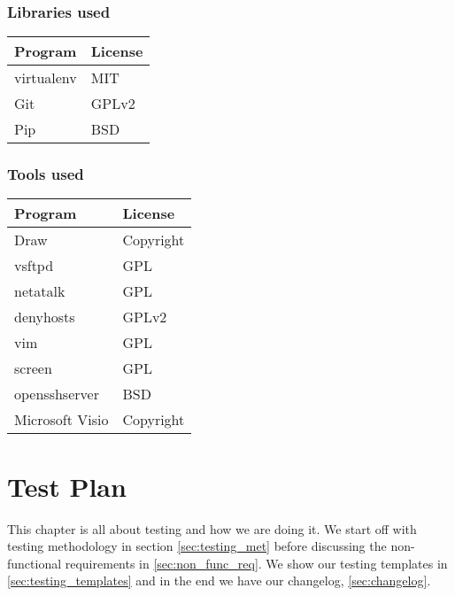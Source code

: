 \documentclass{report}
\begin{document}
\subsection{Libraries used} \label{sec:licenses_libraries}
\begin{tabular}{|l|l|}  \hline
\textbf{Program} & \textbf{License} \\ \hline
virtualenv & \cellcolor{green!25}MIT\cite{license_virtualenv} \\ \hline
Git & \cellcolor{green!25}GPLv2\cite{license_git} \\ \hline
Pip &\cellcolor{green!25} BSD\cite{license_pip} \\ \hline
\end{tabular}
\subsection{Tools used} \label{sec:licenses_tools}
\begin{tabular}{|l|l|}  \hline
\textbf{Program} & \textbf{License} \\ \hline
Draw & \cellcolor{yellow!25}Copyright\cite{license_drawio}  \\ \hline
vsftpd &\cellcolor{green!25} GPL\cite{license_vsftpd}  \\ \hline
netatalk & \cellcolor{green!25}GPL\cite{license_netatalk}  \\ \hline
denyhosts & \cellcolor{green!25}GPLv2\cite{license_denyhosts}  \\ \hline
vim & \cellcolor{green!25}GPL\cite{license_vim}  \\ \hline
screen &\cellcolor{green!25} GPL\cite{license_screen}  \\ \hline
opensshserver &\cellcolor{green!25} BSD\cite{license_openssh}  \\ \hline
Microsoft Visio & \cellcolor{red!25}Copyright\cite{license_visio}  \\ \hline
\end{tabular}

\chapter{Test Plan} \label{cha:test_plan}
This chapter is all about testing and how we are doing it. We start off with testing methodology in section \ref{sec:testing_met} before discussing the non-functional requirements in \ref{sec:non_func_req}. We show our testing templates in \ref{sec:testing_templates} and in the end we have our changelog, \ref{sec:changelog}.
\end{document}
